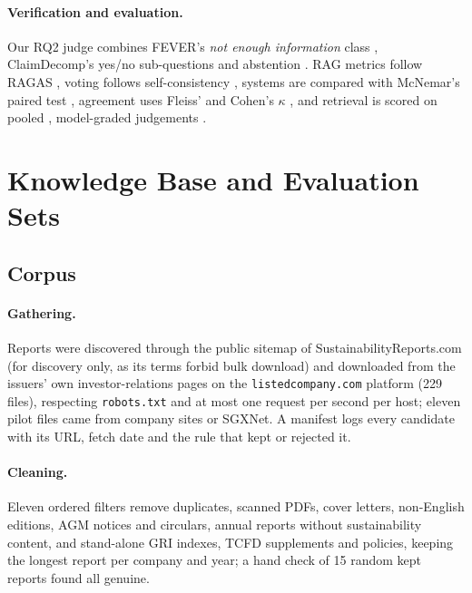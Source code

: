 \documentclass[11pt]{article}
\newcommand{\kappaval}{$\kappa$}
\begin{document}
\paragraph{Verification and evaluation.}
Our RQ2 judge combines FEVER's \emph{not enough information} class \citep{thorne-etal-2018-fever}, ClaimDecomp's yes/no sub-questions \citep{chen-etal-2022-claimdecomp} and abstention \citep{wen2024abstention}. RAG metrics follow RAGAS \citep{es-etal-2024-ragas}, voting follows self-consistency \citep{wang2023selfconsistency}, systems are compared with McNemar's paired test \citep{mcnemar1947,dietterich1998}, agreement uses Fleiss' and Cohen's \kappaval{} \citep{fleiss1971,cohen1960}, and retrieval is scored on pooled \citep{voorhees2000variations}, model-graded judgements \citep{thomas2024llmrelevance}.

\section{Knowledge Base and Evaluation Sets}
\label{sec:design}

\subsection{Corpus}
\label{sec:kb}

\paragraph{Gathering.}
Reports were discovered through the public sitemap of SustainabilityReports.com (for discovery only, as its terms forbid bulk download) and downloaded from the issuers' own investor-relations pages on the \texttt{listedcompany.com} platform (229 files), respecting \texttt{robots.txt} and at most one request per second per host; eleven pilot files came from company sites or SGXNet. A manifest logs every candidate with its URL, fetch date and the rule that kept or rejected it.

\paragraph{Cleaning.}
Eleven ordered filters remove duplicates, scanned PDFs, cover letters, non-English editions, AGM notices and circulars, annual reports without sustainability content, and stand-alone GRI indexes, TCFD supplements and policies, keeping the longest report per company and year; a hand check of 15 random kept reports found all genuine.
\end{document}
